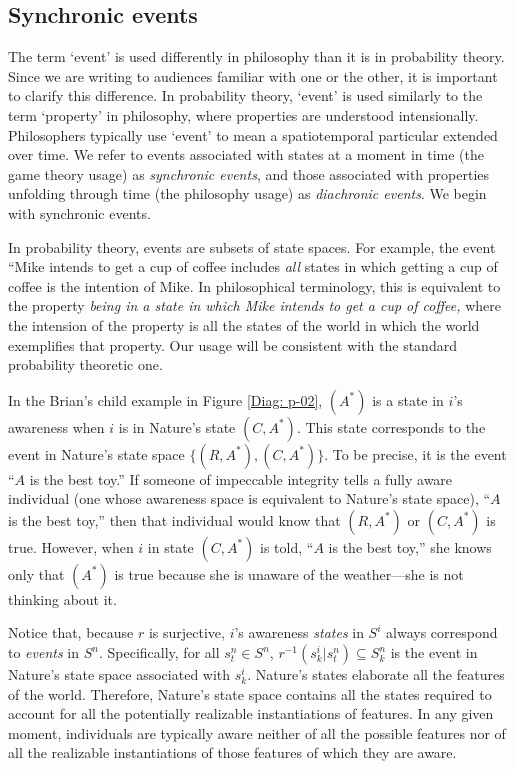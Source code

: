 \documentclass[
11pt,
titlepage,
reqno,
]{article}%
\theoremstyle{definition}
\begin{document}
	
	\subsection{Synchronic events}
	
	The term `event' is used differently in philosophy than it is in probability theory. 
	Since we are writing to audiences familiar with one or the other, it is important to clarify this difference. 
	In probability theory, `event' is used similarly to the term `property' in philosophy, where properties are understood intensionally. 
	Philosophers typically use `event' to mean a spatiotemporal particular extended over time. 
	We refer to events associated with states at a moment in time (the game theory usage) as \textit{synchronic events}, and those associated with properties unfolding through time (the philosophy usage) as \textit{diachronic events}.
	We begin with synchronic events.
	
	In probability theory, events are subsets of state spaces. 
	For example, the event ``Mike intends to get a cup of coffee includes \textit{all} states in which getting a cup of coffee is the intention of Mike. 
	In philosophical terminology, this is equivalent to the property \textit{being in a state in which Mike intends to get a cup of coffee,} where the intension of the property is all the states of the world in which the world exemplifies that property.
	Our usage will be consistent with the standard probability theoretic one.
	
	In the Brian's child example in Figure \ref{Diag: p-02}, $(A^\ast)$ is a state in $i$'s awareness when $i$ is in Nature's state $(C,A^\ast)$.
	This state corresponds to the event in Nature's state space $\{(R,A^\ast),(C,A^\ast)\}$. 
	To be precise, it is the event ``$A$ is the best toy.'' 
	If someone of impeccable integrity tells a fully aware individual (one whose awareness space is equivalent to Nature's state space), ``$A$ is the best toy,'' then that individual would know that   $(R,A^\ast)$ or $(C,A^\ast)$ is true.
	However, when $i$ in state $(C,A^\ast)$ is told, ``$A$ is the best toy,'' she  knows only that $(A^\ast)$ is true because she is unaware of the weather---she is not thinking about it.
	
	Notice that, because $r$ is surjective, $i$'s awareness \textit{states} in $S^i$ always correspond to \textit{events} in $S^n$.
	Specifically, for all $s^n_t\in S^n$, $r^{-1}(s^i_k|s^n_t)\subseteq S^n_k$ is the event in Nature's state space associated with $s^i_k$.
	Nature's states elaborate all the features of the world.
	Therefore, Nature's state space contains all the states required to account for all the potentially realizable instantiations of features.
	In any given moment, individuals are typically aware neither of all the possible features nor of all the realizable instantiations of those features of which they are aware. 
	
\end{document}
